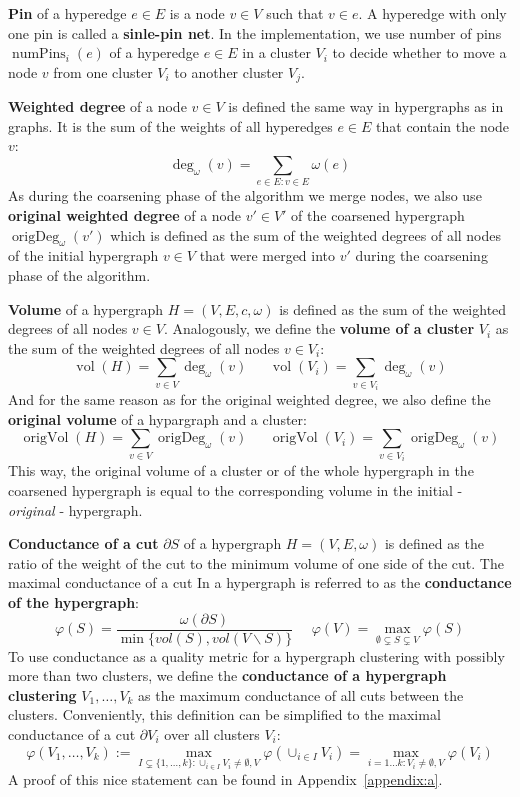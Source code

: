 \documentclass[acmsmall,nonacm,screen,review]{acmart}
\DeclareMathOperator{\vol}{vol}
\DeclareMathOperator{\origVol}{origVol}
\DeclareMathOperator{\origDeg}{origDeg}
\DeclareMathOperator{\numPins}{numPins}
\begin{document}
\smallbreak
\noindent\textbf{Pin} of a hyperedge $e \in E$ is a node $v \in V$ 
such that $v \in e$. A hyperedge with only one pin is called a 
\textbf{sinle-pin net}. In the implementation, we use number of pins 
$\numPins_i(e)$ of a hyperedge $e \in E$ in a cluster $V_i$ to decide 
whether to move a node $v$ from one cluster $V_i$ to another cluster 
$V_j$.

\smallbreak
\noindent\textbf{Weighted degree} of a node $v \in V$ is defined the 
same way in hypergraphs as in graphs. It is the sum of the weights of 
all hyperedges $e \in E$ that contain the node $v$: 
\[\deg_\omega(v) = \sum_{e\in E: v \in E} \omega(e)\]
As during the coarsening phase of the algorithm we merge nodes, we 
also use \textbf{original weighted degree} of a node $v' \in V'$ 
of the coarsened hypergraph $\origDeg_\omega(v')$ which is defined as 
the sum of the weighted degrees of all nodes of the initial hypergraph 
$v \in V$ that were merged into $v'$ during the coarsening phase of 
the algorithm.

\smallbreak
\noindent\textbf{Volume} of a hypergraph $H = (V, E, c, \omega)$ is 
defined as the sum of the weighted degrees of all nodes $v \in V$. 
Analogously, we define the \textbf{volume of a cluster} $V_i$ as the 
sum of the weighted degrees of all nodes $v \in V_i$:
\[\vol(H) = \sum_{v \in V} \deg_\omega(v) \ \ \ \ \ \ \
\vol(V_i) = \sum_{v \in V_i} \deg_\omega(v)\]
And for the same reason as for the original weighted degree, we also 
define the \textbf{original volume} of a hypargraph and a cluster:
\[\origVol(H) = \sum_{v \in V} \origDeg_\omega(v) \ \ \ \ \ \ \
\origVol(V_i) = \sum_{v \in V_i} \origDeg_\omega(v)\]
This way, the original volume of a cluster or of the whole hypergraph 
in the coarsened hypergraph is equal to the corresponding volume in 
the initial - \textit{original} - hypergraph.

\smallbreak
\noindent\textbf{Conductance of a cut} $\partial S$ of a hypergraph 
$H = (V, E, \omega)$ is defined as the ratio of the weight of the cut 
to the minimum volume of one side of the cut. The maximal conductance 
of a cut In a hypergraph is referred to as the 
\textbf{conductance of the hypergraph}: 
\[{\varphi(S)} = \frac{\omega(\partial S)}{\min\{vol(S), vol(V \backslash S)\}}
\ \ \ \ \ \ 
{\varphi(V)} = \max_{\emptyset \subsetneq S \subsetneq V} \varphi(S)
\]
To use conductance as a quality metric for a hypergraph clustering 
with possibly more than two clusters, we define the 
\textbf{conductance of a hypergraph clustering} $V_1, \dots, V_k$ as 
the maximum conductance of all cuts between the clusters. 
Conveniently, this definition can be simplified to the maximal 
conductance of a cut $\partial V_i$ over all clusters $V_i$:
\[\varphi(V_1, \dots, V_k) 
:= \max_{I \subsetneq \{1, \dots, k\}:
                            \cup_{i \in I} V_i \neq \emptyset, V}
        \varphi(\cup_{i \in I} V_i) 
 = \max_{i = 1 \dots k: V_i \neq \emptyset, V} \varphi(V_i)\]
A proof of this nice statement can be found in Appendix~\ref{appendix:a}.
\end{document}
